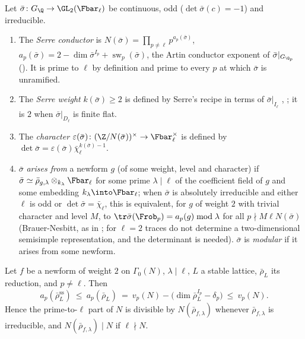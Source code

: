 \begin{definition}\label{def:modgalrep:serre-invariants}
Let $\bar\sigma\colon G_\Q\to\GL_2(\Fbar_\ell)$ be continuous, odd ($\det\bar\sigma(c)=-1$) and irreducible.
\begin{enumerate}[label=(\alph*)]
\item The \emph{Serre conductor} is $N(\bar\sigma)=\prod_{p\ne\ell}p^{a_p(\bar\sigma)}$, $a_p(\bar\sigma)=2-\dim\bar\sigma^{I_p}+\operatorname{sw}_p(\bar\sigma)$, the Artin conductor exponent of $\bar\sigma|_{G_{\Q_p}}$
(). It is prime to $\ell$ by definition and prime to every $p$ at which $\bar\sigma$ is unramified.
\item The \emph{Serre weight} $k(\bar\sigma)\ge2$ is defined by Serre's recipe in terms of $\bar\sigma|_{I_\ell}$ \cite[Section 2]{Serre87}, \cite{Edixhoven92}; it is $2$ when
$\bar\sigma|_{D_\ell}$ is finite flat.
\item The \emph{character} $\varepsilon(\bar\sigma)\colon(\Z/N(\bar\sigma))^\times\to\Fbar_\ell^\times$ is defined by $\det\bar\sigma=\varepsilon(\bar\sigma)\bar\chi_\ell^{k(\bar\sigma)-1}$.
\item $\bar\sigma$ \emph{arises from} a newform $g$ (of some weight, level and character) if $\bar\sigma\simeq\bar\rho_{g,\lambda}\otimes_{k_\lambda}\Fbar_\ell$ for some prime $\lambda\mid\ell$ of the
coefficient field of $g$ and some embedding $k_\lambda\into\Fbar_\ell$; when $\bar\sigma$ is absolutely irreducible and either $\ell$ is odd or $\det\bar\sigma=\bar\chi_\ell$, this is
equivalent, for $g$ of weight $2$ with trivial character and level $M$, to $\tr\bar\sigma(\Frob_p)=a_p(g)\bmod\lambda$ for all $p\nmid M\ell N(\bar\sigma)$ (Brauer-Nesbitt, as in
; for $\ell=2$ traces do not determine a two-dimensional semisimple representation, and the determinant is needed). $\bar\sigma$ is \emph{modular} if it
arises from some newform.
\end{enumerate}
\end{definition}

\begin{proposition}\label{prop:modgalrep:serre-conductor-divides}
Let $f$ be a newform of weight $2$ on $\Gamma_0(N)$, $\lambda\mid\ell$, $L$ a stable lattice, $\bar\rho_L$ its reduction, and $p\ne\ell$. Then
\[
a_p(\bar\rho_L^{\mathrm{ss}})\ \le\ a_p(\bar\rho_L)\ =\ v_p(N)-\bigl(\dim\bar\rho_L^{I_p}-\delta_p\bigr)\ \le\ v_p(N).
\]
Hence the prime-to-$\ell$ part of $N$ is divisible by $N(\bar\rho_{f,\lambda})$ whenever $\bar\rho_{f,\lambda}$ is irreducible, and $N(\bar\rho_{f,\lambda})\mid N$ if $\ell\nmid N$.
\end{proposition}

